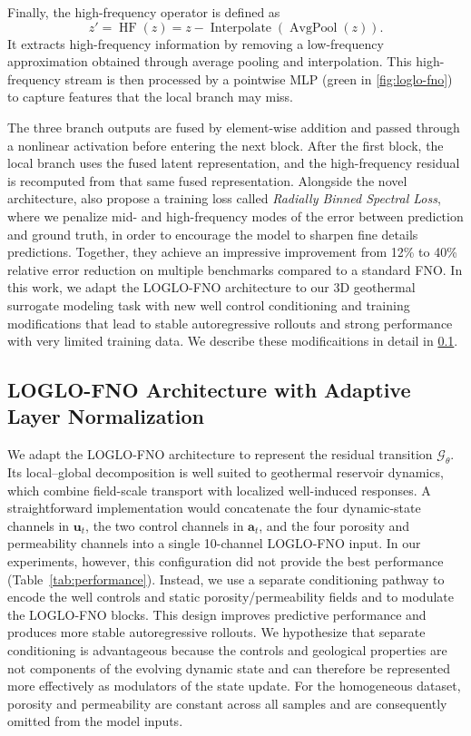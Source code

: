 \documentclass[pdflatex,sn-mathphys-ay]{sn-jnl}
\newcommand{\svec}{\mathbf{u}}            %
\newcommand{\action}{\mathbf{a}}           %
\newcommand{\model}{\mathcal{G}_\theta}    %
\begin{document}
Finally, the high-frequency operator is defined as
\begin{equation}
z' = \operatorname{HF}(z)
= z-\operatorname{Interpolate}\!\left(\operatorname{AvgPool}(z)\right).
\end{equation}
It extracts high-frequency information by removing a low-frequency approximation
obtained through average pooling and interpolation. This high-frequency stream
is then processed by a pointwise MLP (green in \cref{fig:loglo-fno}) to capture
features that the local branch may miss.

The three branch outputs are fused by element-wise addition and passed through a
nonlinear activation before entering the next block. After the first block, the
local branch uses the fused latent representation, and the high-frequency
residual is recomputed from that same fused representation. Alongside the novel architecture,
\cite{loglofno} also propose a training loss called \emph{Radially Binned Spectral Loss}, where
we penalize mid- and high-frequency modes of the error between prediction and ground truth, 
in order to encourage
the model to sharpen fine details predictions. 
Together, they achieve an impressive improvement 
from 12\% to 40\% relative error reduction on multiple benchmarks 
compared to a standard FNO. In this work,
we adapt the LOGLO-FNO architecture to our 3D geothermal surrogate 
modeling task with new well control conditioning and 
training modifications that lead to stable autoregressive rollouts 
and strong performance with very limited training data. We describe these modificaitions
in detail in \cref{sec:arch}.





  \subsection{LOGLO-FNO Architecture with Adaptive Layer Normalization}
\label{sec:arch}

We adapt the LOGLO-FNO architecture to represent the residual transition
\(\model\). Its local--global decomposition is well suited to geothermal
reservoir dynamics, which combine field-scale transport with localized
well-induced responses. A straightforward implementation would concatenate the
four dynamic-state channels in \(\svec_t\), the two control channels in
\(\action_t\), and the four porosity and permeability channels into a single
10-channel LOGLO-FNO input. In our experiments, however, this configuration did
not provide the best performance (Table~\ref{tab:performance}). Instead, we use
a separate conditioning pathway to encode the well controls and static
porosity/permeability fields and to modulate the LOGLO-FNO blocks. This design
improves predictive performance and produces more stable autoregressive
rollouts. We hypothesize that separate conditioning is advantageous because the
controls and geological properties are not components of the evolving dynamic
state and can therefore be represented more effectively as modulators of the
state update. For the homogeneous dataset, porosity and permeability are
constant across all samples and are consequently omitted from the model inputs.
\end{document}
